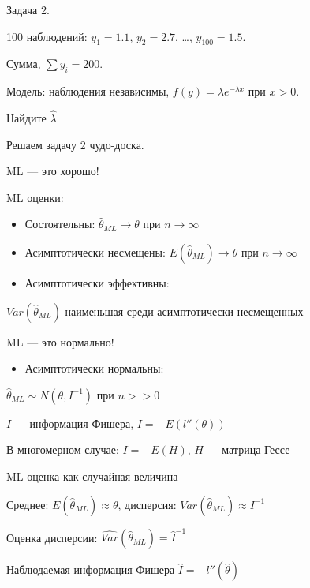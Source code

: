 \documentclass[ignorenonframetext,]{beamer}
\begin{document}
\begin{frame}{Задача 2.}

100 наблюдений: $y_1=1.1$, $y_2=2.7$, \ldots{}, $y_{100}=1.5$.

Сумма, $\sum y_i=200$.

Модель: наблюдения независимы, $f(y)=\lambda e^{-\lambda x}$ при $x>0$.

Найдите $\hat{\lambda}$

\end{frame}

\begin{frame}{Решаем задачу 2 чудо-доска.}

\end{frame}

\begin{frame}{ML --- это хорошо!}

ML оценки:

\begin{itemize}
\itemsep1pt\parskip0pt
\item
  Состоятельны: $\hat{\theta}_{ML} \to \theta$ при $n\to \infty$
\item
  Асимптотически несмещены: $E(\hat{\theta}_{ML}) \to \theta$ при
  $n\to \infty$
\item
  Асимптотически эффективны:
\end{itemize}

$Var(\hat{\theta}_{ML})$ наименьшая среди асимптотически несмещенных

\end{frame}

\begin{frame}{ML --- это нормально!}

\begin{itemize}
\itemsep1pt\parskip0pt
\item
  Асимптотически нормальны:
\end{itemize}

$\hat{\theta}_{ML} \sim N(\theta, I^{-1})$ при $n>>0$

$I$ --- информация Фишера, $I=-E\left( l''(\theta) \right)$

В многомерном случае: $I=-E( H )$, $H$ --- матрица Гессе

\end{frame}

\begin{frame}{ML оценка как случайная величина}

Среднее: $E(\hat{\theta}_{ML}) \approx \theta$, дисперсия:
$Var(\hat{\theta}_{ML}) \approx I^{-1}$

Оценка дисперсии: $\widehat{Var}(\hat{\theta}_{ML})=\hat{I}^{-1}$

Наблюдаемая информация Фишера $\hat{I}=-l''(\hat{\theta})$

\end{frame}
\end{document}

